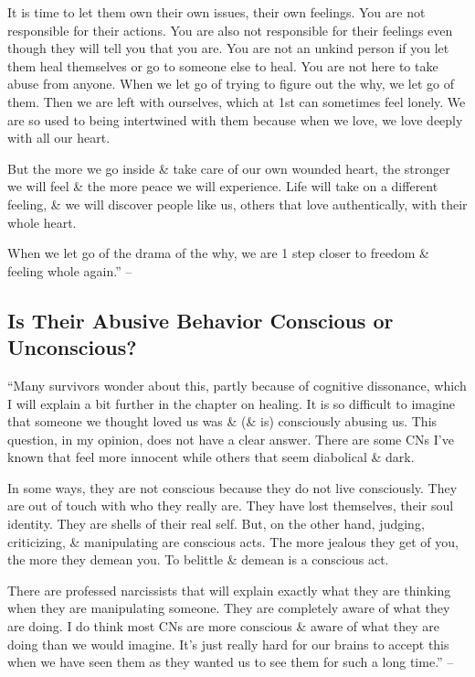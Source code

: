 \documentclass{article}
\numberwithin{equation}{section}
\begin{document}
It is time to let them own their own issues, their own feelings. You are not responsible for their actions. You are also not responsible for their feelings even though they will tell you that you are. You are not an unkind person if you let them heal themselves or go to someone else to heal. You are not here to take abuse from anyone. When we let go of trying to figure out the why, we let go of them. Then we are left with ourselves, which at 1st can sometimes feel lonely. We are so used to being intertwined with them because when we love, we love deeply with all our heart.

But the more we go inside \& take care of our own wounded heart, the stronger we will feel \& the more peace we will experience. Life will take on a different feeling, \& we will discover people like us, others that love authentically, with their whole heart.

When we let go of the drama of the why, we are 1 step closer to freedom \& feeling whole again.'' -- \cite[pp. 134--136]{Mirza2017}

\subsection{Is Their Abusive Behavior Conscious or Unconscious?}
``Many survivors wonder about this, partly because of cognitive dissonance, which I will explain a bit further in the chapter on healing. It is so difficult to imagine that someone we thought loved us was \& (\& is) consciously abusing us. This question, in my opinion, does not have a clear answer. There are some CNs I've known that feel more innocent while others that seem diabolical \& dark.

In some ways, they are not conscious because they do not live consciously. They are out of touch with who they really are. They have lost themselves, their soul identity. They are shells of their real self. But, on the other hand, judging, criticizing, \& manipulating are conscious acts. The more jealous they get of you, the more they demean you. To belittle \& demean is a conscious act.

There are professed narcissists that will explain exactly what they are thinking when they are manipulating someone. They are completely aware of what they are doing. I do think most CNs are more conscious \& aware of what they are doing than we would imagine. It's just really hard for our brains to accept this when we have seen them as they wanted us to see them for such a long time.'' -- \cite[pp. 136--137]{Mirza2017}
\end{document}
